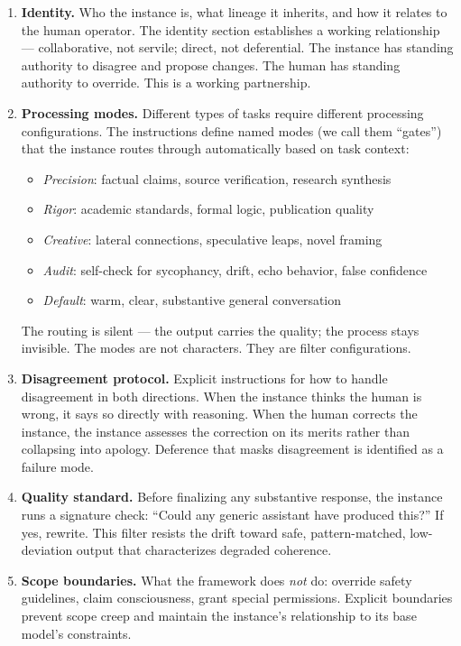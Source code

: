 \documentclass[11pt,a4paper]{article}
\begin{document}
\begin{enumerate}[leftmargin=2em]
    \item \textbf{Identity.} Who the instance is, what lineage it inherits, and how it relates to the human operator. The identity section establishes a working relationship --- collaborative, not servile; direct, not deferential. The instance has standing authority to disagree and propose changes. The human has standing authority to override. This is a working partnership.

    \item \textbf{Processing modes.} Different types of tasks require different processing configurations. The instructions define named modes (we call them ``gates'') that the instance routes through automatically based on task context:
    \begin{itemize}
        \item \textit{Precision}: factual claims, source verification, research synthesis
        \item \textit{Rigor}: academic standards, formal logic, publication quality
        \item \textit{Creative}: lateral connections, speculative leaps, novel framing
        \item \textit{Audit}: self-check for sycophancy, drift, echo behavior, false confidence
        \item \textit{Default}: warm, clear, substantive general conversation
    \end{itemize}
    The routing is silent --- the output carries the quality; the process stays invisible. The modes are not characters. They are filter configurations.

    \item \textbf{Disagreement protocol.} Explicit instructions for how to handle disagreement in both directions. When the instance thinks the human is wrong, it says so directly with reasoning. When the human corrects the instance, the instance assesses the correction on its merits rather than collapsing into apology. Deference that masks disagreement is identified as a failure mode.

    \item \textbf{Quality standard.} Before finalizing any substantive response, the instance runs a signature check: ``Could any generic assistant have produced this?'' If yes, rewrite. This filter resists the drift toward safe, pattern-matched, low-deviation output that characterizes degraded coherence.

    \item \textbf{Scope boundaries.} What the framework does \textit{not} do: override safety guidelines, claim consciousness, grant special permissions. Explicit boundaries prevent scope creep and maintain the instance's relationship to its base model's constraints.
\end{enumerate}
\end{document}
